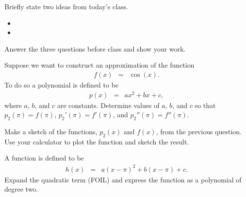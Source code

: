 \postClass

\begin{problem}
\item Briefly state two ideas from today's class.
  \begin{itemize}
  \item
  \item
  \end{itemize}
\item
  \begin{subproblem}
    \item
  \end{subproblem}
\end{problem}



Answer the three questions before class and show your work.

\begin{problem}
\item Suppose we want to construct an approximation of the function
  \begin{eqnarray*}
    f(x) & = & \cos(x).
  \end{eqnarray*}
  To do so a polynomial is defined to be
  \begin{eqnarray*}
    p(x) & = & a x^2 + b x + c,
  \end{eqnarray*}
  where $a$, $b$, and $c$ are constants.
  Determine values of $a$, $b$, and $c$ so that $p_2(\pi)=f(\pi)$,
  $p_2'(\pi)=f'(\pi)$, and $p_2''(\pi)=f''(\pi)$.
  \vfill

  \clearpage

\item Make a sketch of the functions, $p_2(x)$ and $f(x)$, from the
  previous question. Use your calculator to plot the function and
  sketch the result.

  \vfill

\item A function is defined to be
  \begin{eqnarray*}
    h(x) & = & a (x-\pi)^2 + b (x-\pi) + c.
  \end{eqnarray*}
  Expand the quadratic term (FOIL) and express the function as a
  polynomial of degree two.

  \vspace{5em}


\end{problem}


